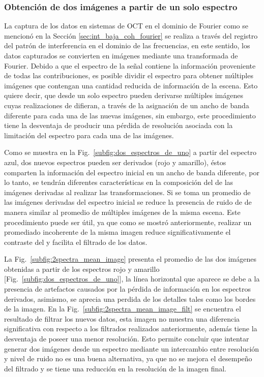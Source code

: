 \subsubsection{Obtención de dos imágenes a partir de un solo espectro}

La captura de los datos en sistemas de OCT en el dominio de Fourier como se mencionó en la Sección \ref{sec:int_baja_coh_fourier} se realiza a través del registro del patrón de interferencia en el dominio de las frecuencias, en este sentido, los datos capturados se convierten en imágenes mediante una transformada de Fourier. Debido a que el espectro de la señal contiene la información proveniente de todas las contribuciones, es posible dividir el espectro para obtener múltiples imágenes que contengan una cantidad reducida de información de la escena. Esto quiere decir, que desde un solo espectro pueden derivarse múltiples imágenes cuyas realizaciones de \speckle difieran, a través de la asignación de un ancho de banda diferente para cada una de las nuevas imágenes, sin embargo, este procedimiento tiene la desventaja de producir una pérdida de resolución asociada con la limitación del espectro para cada una de las imágenes. 

Como se muestra en la Fig.~\ref{subfig:dos_espectros_de_uno} a partir del espectro azul, dos nuevos espectros pueden ser derivados (rojo y amarillo), éstos comparten la información del espectro inicial en un ancho de banda diferente, por lo tanto, se tendrán diferentes características en la composición del \speckle de las imágenes derivadas al realizar las transformaciones. Si se toma un promedio de las imágenes derivadas del espectro inicial se reduce la presencia de ruido de \speckle de manera similar al promedio de múltiples imágenes de la misma escena. Este procedimiento puede ser útil, ya que como se mostró anteriormente, realizar un promediado incoherente de la misma imagen reduce significativamente el contraste del \speckle y facilita el filtrado de los datos. 

La Fig.~\ref{subfig:2spectra_mean_image} presenta el promedio de las dos imágenes obtenidas a partir de los espectros rojo y amarillo [Fig.~\ref{subfig:dos_espectros_de_uno}], la línea horizontal que aparece se debe a la presencia de artefactos causados por la pérdida de información en los espectros derivados, asimismo, se aprecia una perdida de los detalles tales como los bordes de la imagen. En la Fig.~\ref{subfig:2spectra_mean_image_filt} se encuentra el resultado de filtrar los nuevos datos, esta imagen no muestra una diferencia significativa con respecto a los filtrados realizados anteriormente, además tiene la desventaja de poseer una menor resolución. Esto permite concluir que intentar generar dos imágenes desde un espectro mediante un intercambio entre resolución y nivel de ruido no es una buena alternativa, ya que no se mejora el desempeño del filtrado y se tiene una reducción en la resolución de la imagen final.


